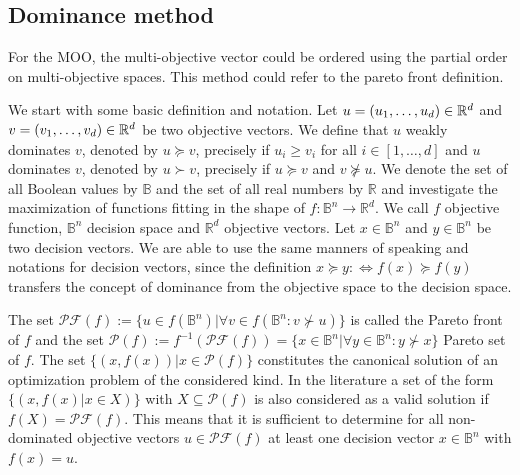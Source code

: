 \subsection{Dominance method}

For the MOO, the multi-objective vector could be ordered using the partial order on multi-objective spaces\cite{zitzler2003performance}. This method could refer to the pareto front definition. 

We start with some basic definition and notation. Let $u=(u_1,\dots,u_d)\in \mathbb{R}^d$ and $v=(v_1,\dots,v_d)\in\mathbb{R}^d$ 
be two objective vectors. We define that $u$ weakly dominates $v$, denoted by $u\succeq v$, precisely if $u_i\geqslant v_i$ for all $i\in [1,\dots,d]$ and $u$ dominates $v$, denoted by $u\succ v$, precisely if $u\succeq v$ and $v\nsucceq u$. We denote the set of all Boolean values by $\mathbb{B}$ and the set of all real numbers by $\mathbb{R}$ and investigate the maximization of functions fitting in the shape of $f: \mathbb{B}^n \rightarrow \mathbb{R}^d$. 
We call $f$ objective function, $\mathbb{B}^n$ decision space and $\mathbb{R}^d$ objective vectors.  Let $x\in \mathbb{B}^n$ and $y\in\mathbb{B}^n$ be two decision vectors. We are able to use the same manners of speaking and notations for decision vectors, since the definition 
$x\succeq y : \Leftrightarrow f(x)\succeq f(y)$ transfers the concept of dominance from the objective space to the decision space. 

The set $\mathscr{PF}(f) := \{u\in f(\mathbb{B}^n)|\forall v \in f(\mathbb{B}^n: v\nsucc u)\}$ is called the Pareto front of $f$  and the set $\mathscr{P}(f):= f^{-1}(\mathscr{PF}(f)) = \{x\in \mathbb{B}^n| \forall y \in \mathbb{B}^n: y\nsucc x \}$ Pareto set of $f$. 
The set $\{(x,f(x))|x\in\mathscr{P}(f)\}$ constitutes the canonical solution of an optimization problem of the considered kind. In the literature a set of the form $\{(x,f(x)|x\in X)\}$ with $X\subseteq \mathscr{P}(f)$ is also considered as a valid solution if $f(X) = \mathscr{PF}(f)$. 
This means that it is sufficient to determine for all non-dominated objective vectors $u\in \mathscr{PF}(f)$ at least one decision vector $x\in\mathbb{B}^n$ with $f(x)=u$.

